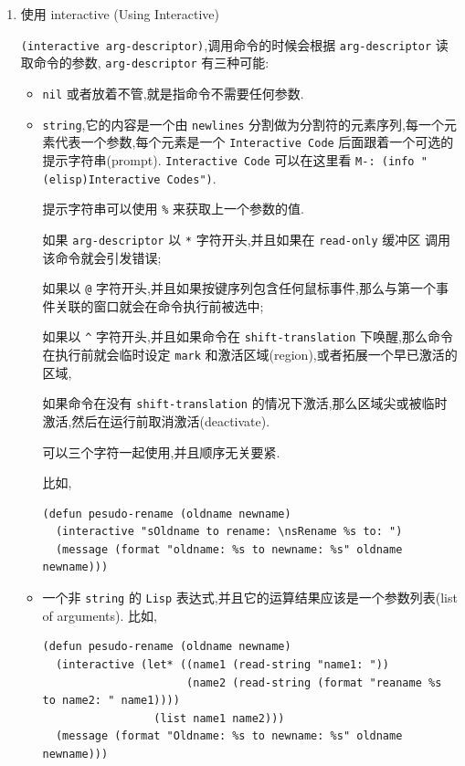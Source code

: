 \documentclass[11pt]{article}
\begin{document}
\begin{enumerate}
\item 使用 interactive (Using Interactive)
\label{sec:org60f5d9d}

\texttt{(interactive arg-descriptor)},调用命令的时候会根据 \texttt{arg-descriptor} 读取命令的参数, \texttt{arg-descriptor} 有三种可能:

\begin{itemize}
\item \texttt{nil} 或者放着不管,就是指命令不需要任何参数.

\item \texttt{string},它的内容是一个由 \texttt{newlines} 分割做为分割符的元素序列,每一个元素代表一个参数,每个元素是一个 \texttt{Interactive Code} 后面跟着一个可选的提示字符串(prompt). \texttt{Interactive Code} 可以在这里看 \texttt{M-: (info "(elisp)Interactive Codes")}.

提示字符串可以使用 \texttt{\%} 来获取上一个参数的值.

如果 \texttt{arg-descriptor} 以 \texttt{*} 字符开头,并且如果在 \texttt{read-only} 缓冲区 调用该命令就会引发错误;

如果以 \texttt{@} 字符开头,并且如果按键序列包含任何鼠标事件,那么与第一个事件关联的窗口就会在命令执行前被选中;

如果以 \texttt{\textasciicircum{}} 字符开头,并且如果命令在 \texttt{shift-translation} 下唤醒,那么命令在执行前就会临时设定 \texttt{mark} 和激活区域(region),或者拓展一个早已激活的区域,

如果命令在没有 \texttt{shift-translation} 的情况下激活,那么区域尖或被临时激活,然后在运行前取消激活(deactivate).

可以三个字符一起使用,并且顺序无关要紧.

比如,

\begin{verbatim}
(defun pesudo-rename (oldname newname)
  (interactive "sOldname to rename: \nsRename %s to: ")
  (message (format "oldname: %s to newname: %s" oldname newname)))
\end{verbatim}

\item 一个非 \texttt{string} 的 \texttt{Lisp} 表达式,并且它的运算结果应该是一个参数列表(list of arguments).
比如,
\begin{verbatim}
(defun pesudo-rename (oldname newname)
  (interactive (let* ((name1 (read-string "name1: "))
                      (name2 (read-string (format "reaname %s to name2: " name1))))
                 (list name1 name2)))
  (message (format "Oldname: %s to newname: %s" oldname newname)))
\end{verbatim}


\end{itemize}
\end{enumerate}
\end{document}
